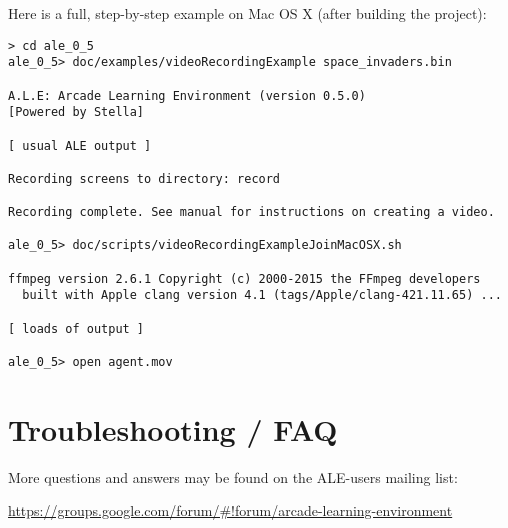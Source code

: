 \documentclass[12pt]{article}
\begin{document}
Here is a full, step-by-step example on Mac OS X (after building the project):
\begin{verbatim}
> cd ale_0_5
ale_0_5> doc/examples/videoRecordingExample space_invaders.bin

A.L.E: Arcade Learning Environment (version 0.5.0)
[Powered by Stella]

[ usual ALE output ]

Recording screens to directory: record

Recording complete. See manual for instructions on creating a video.

ale_0_5> doc/scripts/videoRecordingExampleJoinMacOSX.sh

ffmpeg version 2.6.1 Copyright (c) 2000-2015 the FFmpeg developers
  built with Apple clang version 4.1 (tags/Apple/clang-421.11.65) ... 

[ loads of output ]

ale_0_5> open agent.mov
\end{verbatim}

\section{Troubleshooting / FAQ} \label{sec:troubleshooting}

More questions and answers may be found on the ALE-users mailing list:
\begin{center}
\url{https://groups.google.com/forum/#!forum/arcade-learning-environment}
\end{center}
\end{document}
